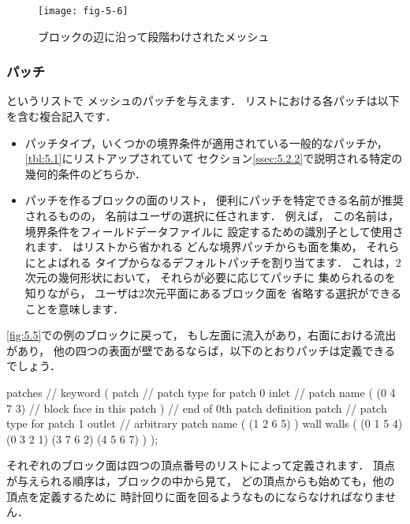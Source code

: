 \begin{figure}[ht]
 \texttt{[image: fig-5-6]}
 \caption{ブロックの辺に沿って段階わけされたメッシュ}
 \label{fig:5.6}
\end{figure}


\subsubsection{パッチ}
\label{sssec:5.3.1.4}
%
%
というリストで
メッシュのパッチを与えます．
リストにおける各パッチは以下を含む複合記入です．
\begin{itemize}
 \item パッチタイプ，いくつかの境界条件が適用されている一般的なパッチか，
       \autoref{tbl:5.1}にリストアップされていて
       セクション\autoref{ssec:5.2.2}で説明される特定の幾何的条件のどちらか．
 \item パッチを作るブロックの面のリスト，
       便利にパッチを特定できる名前が推奨されるものの，
       名前はユーザの選択に任されます．
       例えば，
       この名前は，境界条件をフィールドデータファイルに
       設定するための識別子として使用されます．
       はリストから省かれる
       どんな境界パッチからも面を集め，
       それらにとよばれる
       タイプからなるデフォルトパッチを割り当てます．
       これは，2次元の幾何形状において，
       それらが必要に応じてパッチに
       集められるのを知りながら，
       ユーザは2次元平面にあるブロック面を
       省略する選択ができることを意味します．
\end{itemize}
\autoref{fig:5.5}での例のブロックに戻って，
もし左面に流入があり，右面における流出があり，
他の四つの表面が壁であるならば，以下のとおりパッチは定義できるでしょう．
\begin{OFverbatim}[file]
patches // keyword
(
patch // patch type for patch 0
inlet // patch name
(
(0 4 7 3) // block face in this patch
) // end of 0th patch definition
patch // patch type for patch 1
outlet // arbitrary patch name
(
(1 2 6 5)
)
wall
walls
(
(0 1 5 4)
(0 3 2 1)
(3 7 6 2)
(4 5 6 7)
)
);
\end{OFverbatim}
それぞれのブロック面は四つの頂点番号のリストによって定義されます．
頂点が与えられる順序は，ブロックの中から見て，
どの頂点からも始めても，他の頂点を定義するために
時計回りに面を回るようなものにならなければなりません．



